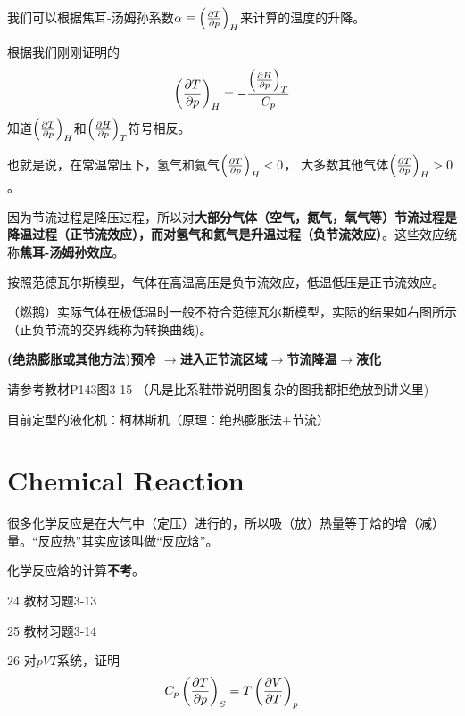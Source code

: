 \documentclass[CJK]{beamer}
\begin{document}
\begin{frame}
\bch
{\small
我们可以根据焦耳-汤姆孙系数$\alpha \equiv \left(\frac{\partial T}{\partial p}\right)_{H}$来计算的温度的升降。

根据我们刚刚证明的
$$\left(\frac{\partial T}{\partial p}\right)_{H} = - \frac{\left(\frac{\partial H}{\partial p}\right)_{T}}{C_p}$$
知道$\left(\frac{\partial T}{\partial p}\right)_{H}$和$\left(\frac{\partial H}{\partial p}\right)_{T}$符号相反。

也就是说，在常温常压下，氢气和氦气$\left(\frac{\partial T}{\partial p}\right)_{H} < 0$， 大多数其他气体$\left(\frac{\partial T}{\partial p}\right)_{H} > 0$。

因为节流过程是降压过程，所以对{\bf 大部分气体（空气，氮气，氧气等）节流过程是降温过程（正节流效应），而对氢气和氦气是升温过程（负节流效应）}。这些效应统称{\bf 焦耳-汤姆孙效应}。
}
\ech
\end{frame}

\begin{frame}
\bch

按照范德瓦尔斯模型，气体在高温高压是负节流效应，低温低压是正节流效应。

\skiplines

（燃鹅）实际气体在极低温时一般不符合范德瓦尔斯模型，实际的结果如右图所示（正负节流的交界线称为转换曲线)。
\emini
{}
\emini
\ech
\end{frame}


\begin{frame}
\bch
{\bf (绝热膨胀或其他方法)预冷 $\rightarrow$进入正节流区域$\rightarrow$节流降温$\rightarrow$液化}

\skiplines

请参考教材P143图3-15 （凡是比系鞋带说明图复杂的图我都拒绝放到讲义里\bye)

\skiplines

目前定型的液化机：柯林斯机（原理：绝热膨胀法+节流）
\ech
\end{frame}

\section{Chemical Reaction}

\begin{frame}
\bch
很多化学反应是在大气中（定压）进行的，所以吸（放）热量等于焓的增（减）量。“反应热”其实应该叫做“反应焓”。

\skiplines

化学反应焓的计算{\bf \Huge 不考}。
\ech
\end{frame}

\begin{frame}
\bch
\bitem
\item[24]{ 教材习题3-13}
\item[25]{ 教材习题3-14}
\item[26]{ 对$pVT$系统，证明
$$C_p \left(\frac{\partial T}{\partial p}\right)_{S} = T \left(\frac{\partial V}{\partial T}\right)_{p} $$ }
\eitem
\ech
\end{frame}
\end{document}
